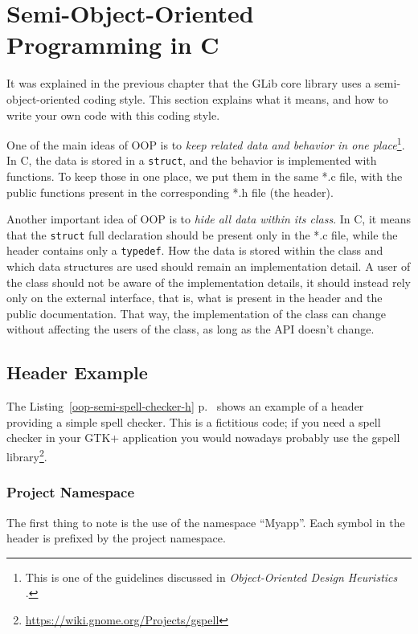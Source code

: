 \chapter{Semi-Object-Oriented Programming in C}

It was explained in the previous chapter that the GLib core library uses a semi-object-oriented coding style. This section explains what it means, and how to write your own code with this coding style.

One of the main ideas of OOP is to \emph{keep related data and behavior in one place}\footnote{This is one of the guidelines discussed in \emph{Object-Oriented Design Heuristics} \cite{oop-book}.}. In C, the data is stored in a \lstinline{struct}, and the behavior is implemented with functions. To keep those in one place, we put them in the same *.c file, with the public functions present in the corresponding *.h file (the header).

Another important idea of OOP is to \emph{hide all data within its class}. In C, it means that the \lstinline{struct} full declaration should be present only in the *.c file, while the header contains only a \lstinline{typedef}. How the data is stored within the class and which data structures are used should remain an implementation detail. A user of the class should not be aware of the implementation details, it should instead rely only on the external interface, that is, what is present in the header and the public documentation. That way, the implementation of the class can change without affecting the users of the class, as long as the API doesn't change.

\section{Header Example}

The Listing~\ref{oop-semi-spell-checker-h} p.~\pageref{oop-semi-spell-checker-h} shows an example of a header providing a simple spell checker. This is a fictitious code; if you need a spell checker in your GTK+ application you would nowadays probably use the gspell library\footnote{\url{https://wiki.gnome.org/Projects/gspell}}.



\subsection{Project Namespace}
The first thing to note is the use of the namespace ``Myapp''. Each symbol in the header is prefixed by the project namespace.


